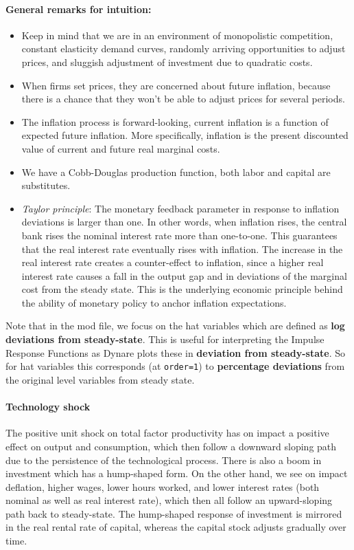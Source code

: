 \begin{enumerate}
\paragraph{General remarks for intuition:}
\begin{itemize}
\item Keep in mind that we are in an environment of monopolistic competition,
  constant elasticity demand curves, randomly arriving opportunities to adjust prices,
  and sluggish adjustment of investment due to quadratic costs.
\item When firms set prices, they are concerned about future inflation,
  because there is a chance that they won't be able to adjust prices for several periods.			
\item The inflation process is forward-looking, current inflation is a function of expected future inflation.
More specifically, inflation is the present discounted value of current and future real marginal costs.
\item We have a Cobb-Douglas production function, both labor and capital are substitutes.
\item \emph{Taylor principle}: The monetary feedback parameter in response to inflation deviations is larger than one.
In other words, when inflation rises, the central bank rises the nominal interest rate more than one-to-one.
This guarantees that the real interest rate eventually rises with inflation.
The increase in the real interest rate creates a counter-effect to inflation,
  since a higher real interest rate causes a fall in the output gap and in deviations of the marginal cost from the steady state.
This is the underlying economic principle behind the ability of monetary policy to anchor inflation expectations.
\end{itemize}
Note that in the mod file, we focus on the hat variables which are defined as \textbf{log deviations from steady-state}.
This is useful for interpreting the Impulse Response Functions as Dynare plots these in \textbf{deviation from steady-state}.
So for hat variables this corresponds (at \texttt{order=1}) to \textbf{percentage deviations} from the original level variables from steady state.
  
\paragraph{Technology shock}
The positive unit shock on total factor productivity has on impact a positive effect on output and consumption,
  which then follow a downward sloping path due to the persistence of the technological process.
There is also a boom in investment which has a hump-shaped form.
On the other hand, we see on impact deflation, higher wages, lower hours worked,
  and lower interest rates (both nominal as well as real interest rate),
which then all follow an upward-sloping path back to steady-state.
The hump-shaped response of investment is mirrored in the real rental rate of capital,
  whereas the capital stock adjusts gradually over time.


\end{enumerate}
